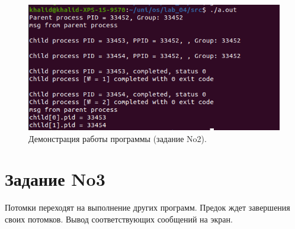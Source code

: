 \documentclass[12pt]{report}
\begin{document}
\begin{figure}[H]

	\centering

	\includegraphics[width=\linewidth]{img/task02.png}
	\caption{Демонстрация работы программы (задание No2).}

	\label{fig:task02}

\end{figure}

\section*{Задание No3}

Потомки переходят на выполнение других программ. Предок ждет завершения своих потомков. Вывод соответствующих сообщений на экран.
\end{document}
